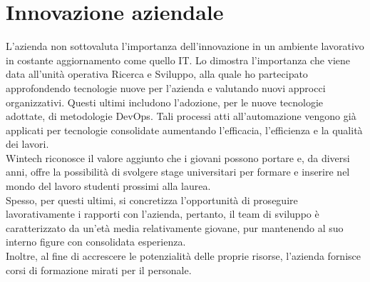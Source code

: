 \section{Innovazione aziendale}
L'azienda non sottovaluta l'importanza dell'innovazione in un ambiente lavorativo in costante aggiornamento come quello IT. Lo dimostra l'importanza che viene data all'unità operativa Ricerca e Sviluppo, alla quale ho partecipato approfondendo tecnologie nuove per l'azienda e valutando nuovi approcci organizzativi. Questi ultimi includono l'adozione, per le nuove tecnologie adottate, di metodologie DevOps. Tali processi atti all'automazione vengono già applicati per tecnologie consolidate aumentando l'efficacia, l'efficienza e la qualità dei lavori.\\
Wintech riconosce il valore aggiunto che i giovani possono portare e, da diversi anni, offre la possibilità di svolgere stage universitari per formare e inserire nel mondo del lavoro studenti prossimi alla laurea.\\
Spesso, per questi ultimi, si concretizza l'opportunità di proseguire lavorativamente i rapporti con l'azienda, pertanto, il team di sviluppo è caratterizzato da un'età media relativamente giovane, pur mantenendo al suo interno figure con consolidata esperienza.\\ 
Inoltre, al fine di accrescere le potenzialità delle proprie risorse, l'azienda fornisce corsi di formazione mirati per il personale.
